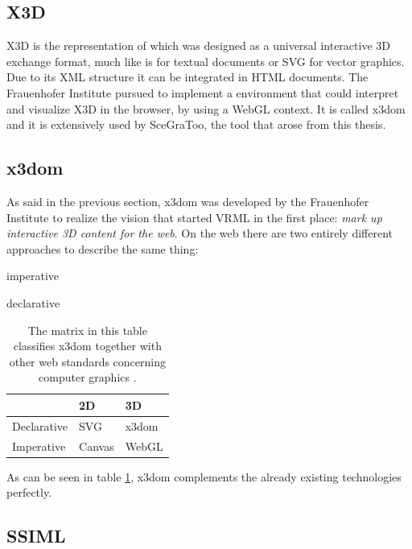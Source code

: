 \subsection{X3D}
\label{x3d} \gls{X3D} \cite{x3d} is the  representation of  which was designed as a
universal interactive \gls{3D} exchange format, much like  is for textual
documents or \acrshort{SVG} for vector graphics. Due to its \gls{XML} structure it can be
integrated in \gls{HTML} documents. The Frauenhofer Institute pursued to
implement a environment that could interpret and visualize \gls{X3D} in the browser, by
using a \gls{WebGL} context. It is called x3dom \cite{x3dom} and it is extensively used
by SceGraToo, the tool that arose from this thesis.

\subsection{x3dom}
\label{par:x3dom}

As said in the previous section, x3dom was developed by the Frauenhofer
Institute to realize the vision that started \gls{VRML} in the first place: \emph{mark
up interactive \gls{3D} content for the web}. On the web there are two entirely
different approaches to describe the same thing:

\begin{itemize*}
  \item imperative
  \item declarative
\end{itemize*}

\begin{longtable}[c]{@{}lll@{}}
  \caption{The matrix in this table classifies x3dom together with other web standards concerning computer graphics \cite{x3dom}.\label{tab:feature_matrix}}\\
  \toprule
  & 2D & \gls{3D} \tabularnewline
  \midrule
  \endhead
  Declarative & \gls{SVG} \cite{svg} & x3dom \cite{x3dom} \tabularnewline
  Imperative  & Canvas \cite{canvas} & \gls{WebGL} \cite{webgl} \tabularnewline
  \bottomrule
\end{longtable}

As can be seen in table \ref{tab:feature_matrix}, x3dom complements the already existing technologies
perfectly.

\clearpage
\subsection{SSIML}
\label{ssiml}

